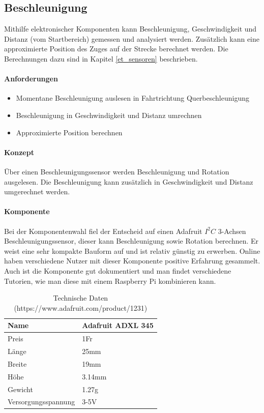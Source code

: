\documentclass[../../main.tex]{subfiles}
\begin{document}
\subsection{Beschleunigung} \label{pi_beschleunigung}
Mithilfe elektronischer Komponenten kann Beschleunigung, Geschwindigkeit und Distanz (vom Startbereich) gemessen und analysiert werden. Zusätzlich kann eine approximierte Position des Zuges auf der Strecke berechnet werden. Die Berechnungen dazu sind in Kapitel \ref{et_sensoren} beschrieben.

\paragraph{Anforderungen}
\begin{itemize}
    \item Momentane Beschleunigung auslesen
      \subitem in Fahrtrichtung
      \subitem Querbeschleunigung
    \item Beschleunigung in Geschwindigkeit und Distanz umrechnen
    \item Approximierte Position berechnen
\end{itemize}

\paragraph{Konzept}
Über einen Beschleunigungssensor werden Beschleunigung und Rotation ausgelesen. Die Beschleunigung kann zusätzlich in Geschwindigkeit und Distanz umgerechnet werden.

\paragraph{Komponente}
Bei der Komponentenwahl fiel der Entscheid auf einen Adafruit $I^2C$ 3-Achsen Beschleunigungssensor, dieser kann Beschleunigung sowie Rotation berechnen. Er weist eine sehr kompakte Bauform auf und ist relativ günstig zu erwerben. Online haben verschiedene Nutzer mit dieser Komponente positive Erfahrung gesammelt. Auch ist die Komponente gut dokumentiert und man findet verschiedene Tutorien, wie man diese mit einem Raspberry Pi kombinieren kann.

\begin{table}[H]
\begin{center}
\begin{tabular}{ll}
Name & Adafruit ADXL 345  \\ \hline
Preis & 1Fr               \\ \hline
Länge & 25mm              \\ \hline
Breite & 19mm             \\ \hline
Höhe & 3.14mm             \\ \hline
Gewicht & 1.27g           \\ \hline
Versorgungsspannung & 3-5V \\ \hline
\end{tabular}
\caption {Technische Daten (https://www.adafruit.com/product/1231)}
\end{center}
\end{table}
\end{document}
